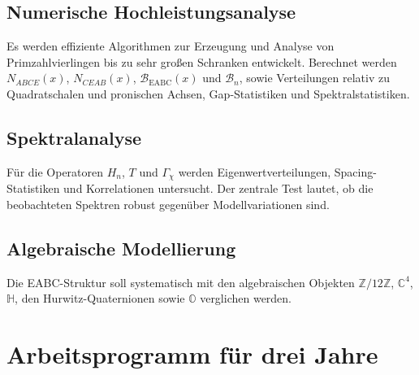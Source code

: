 \documentclass[11pt,a4paper,bibliography=totoc]{scrartcl}
\begin{document}
	\subsection{Numerische Hochleistungsanalyse}
	Es werden effiziente Algorithmen zur Erzeugung und Analyse von Primzahlvierlingen bis zu sehr großen Schranken entwickelt. Berechnet werden $N_{ABCE}(x)$, $N_{CEAB}(x)$, $\mathcal{B}_{\mathrm{EABC}}(x)$ und $\mathcal{B}_n$, sowie Verteilungen relativ zu Quadratschalen und pronischen Achsen, Gap-Statistiken und Spektralstatistiken.
	
	\subsection{Spektralanalyse}
	Für die Operatoren $H_n$, $T$ und $\Gamma_\chi$ werden Eigenwertverteilungen, Spacing-Statistiken und Korrelationen untersucht. Der zentrale Test lautet, ob die beobachteten Spektren robust gegenüber Modellvariationen sind.
	
	\subsection{Algebraische Modellierung}
	Die EABC-Struktur soll systematisch mit den algebraischen Objekten $\mathbb{Z}/12\mathbb{Z}$, $\mathbb{C}^4$, $\mathbb{H}$, den Hurwitz-Quaternionen sowie $\mathbb{O}$ verglichen werden.
	
	\section{Arbeitsprogramm für drei Jahre}
	
\end{document}
